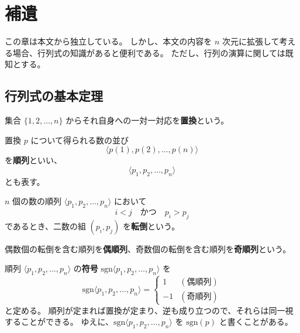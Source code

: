 \chapter{補遺}

\setcounter{thm}{0}
\setcounter{dfn}{0}
\setcounter{col}{0}
\setcounter{lmm}{0}

この章は本文から独立している。
しかし、本文の内容を \(n\) 次元に拡張して考える場合、行列式の知識があると便利である。
ただし、行列の演算に関しては既知とする。

\section*{行列式の基本定理}

\begin{dfn}[置換]
  集合 \(\{1,2,\ldots,n\}\) からそれ自身への一対一対応を\textbf{置換}という。
\end{dfn}

\begin{dfn}[順列]
  置換 \(p\) について得られる数の並び
  \[\langle p(1),p(2),\ldots,p(n)\rangle\]
  を\textbf{順列}といい、
  \[\langle p_1,p_2,\ldots,p_n\rangle\]
  とも表す。
\end{dfn}

\begin{dfn}[転倒]
  \(n\) 個の数の順列 \(\langle p_1,p_2,\ldots,p_n\rangle\) において
  \[i<j \quad\text{かつ}\quad p_i>p_j\]
  であるとき、二数の組 \((p_i,p_j)\) を\textbf{転倒}という。
\end{dfn}

\begin{dfn}
  偶数個の転倒を含む順列を\textbf{偶順列}、奇数個の転倒を含む順列を\textbf{奇順列}という。
\end{dfn}

\begin{dfn}[符号]
  順列 \(\langle p_1,p_2,\ldots,p_n\rangle\) の\textbf{符号} \(\mathrm{sgn}\langle p_1,p_2,\ldots,p_n\rangle\) を
  \begin{equation*}
    \mathrm{sgn}\langle p_1,p_2,\ldots,p_n\rangle=
    \begin{cases}
      1  & (偶順列) \\
      -1 & (奇順列)
    \end{cases}
  \end{equation*}
  と定める。
  順列が定まれば置換が定まり、逆も成り立つので、それらは同一視することができる。
  ゆえに、\(\mathrm{sgn}\langle p_1,p_2,\ldots,p_n\rangle\) を \(\mathrm{sgn}(p)\) と書くことがある。
\end{dfn}

